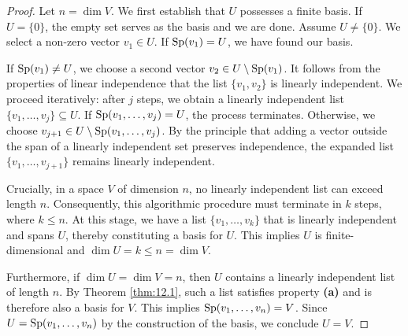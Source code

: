 \begin{proof}
Let $n = \dim V$. We first establish that $U$ possesses a finite basis. If $U = \{0\}$, the empty set serves as the basis and we are done. Assume $U \neq \{0\}$. We select a non-zero vector $v_1 \in U$. If $\operatorname{Sp}(v_1) = U$, we have found our basis. 

If $\operatorname{Sp}(v_1) \neq U$, we choose a second vector $v_2 \in U \setminus \operatorname{Sp}(v_1)$. It follows from the properties of linear independence that the list $\{v_1, v_2\}$ is linearly independent. We proceed iteratively: after $j$ steps, we obtain a linearly independent list $\{v_1, \dots, v_j\} \subseteq U$. If $\operatorname{Sp}(v_1, \dots, v_j) = U$, the process terminates. Otherwise, we choose $v_{j+1} \in U \setminus \operatorname{Sp}(v_1, \dots, v_j)$. By the principle that adding a vector outside the span of a linearly independent set preserves independence, the expanded list $\{v_1, \dots, v_{j+1}\}$ remains linearly independent.

Crucially, in a space $V$ of dimension $n$, no linearly independent list can exceed length $n$. Consequently, this algorithmic procedure must terminate in $k$ steps, where $k \le n$. At this stage, we have a list $\{v_1, \dots, v_k\}$ that is linearly independent and spans $U$, thereby constituting a basis for $U$. This implies $U$ is finite-dimensional and $\dim U = k \le n = \dim V$.

Furthermore, if $\dim U = \dim V = n$, then $U$ contains a linearly independent list of length $n$. By Theorem \ref{thm:12.1}, such a list satisfies property \textbf{(a)} and is therefore also a basis for $V$. This implies $\operatorname{Sp}(v_1, \dots, v_n) = V$. Since $U = \operatorname{Sp}(v_1, \dots, v_n)$ by the construction of the basis, we conclude $U = V$.
\end{proof}
